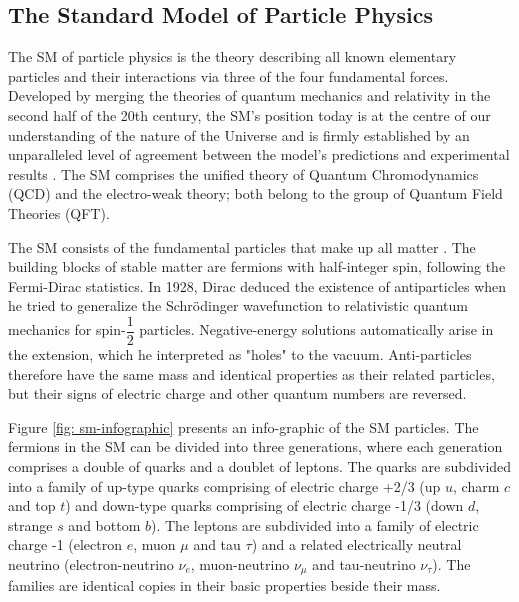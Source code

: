 \subsection{The Standard Model of Particle Physics}
The SM of particle physics \cite{SM-bkg, PhysRevLett.19.1264, GLASHOW1961579} is the theory describing all known elementary particles and their interactions via three of the four fundamental forces. Developed by merging the theories of quantum mechanics and relativity in the second half of the 20th century, the SM’s position today is at the centre of our understanding of the nature of the Universe and is firmly established by an unparalleled level of agreement between the model’s predictions and experimental results \cite{Morel2020-kf}. The SM comprises the unified theory of Quantum Chromodynamics (QCD) and the electro-weak theory; both belong to the group of Quantum Field Theories (QFT).

The SM consists of the fundamental particles that make up all matter \cite{Povh:1995mua}. The building blocks of stable matter are fermions with half-integer spin, following the Fermi-Dirac statistics. In 1928, Dirac deduced the existence of antiparticles when he tried to generalize the Schr\"{o}dinger wavefunction to relativistic quantum mechanics for spin-$\dfrac{1}{2}$ particles. Negative-energy solutions automatically arise in the extension, which he interpreted as "holes" to the vacuum. Anti-particles therefore have the same mass and identical properties as their related particles, but their signs of electric charge and other quantum numbers are reversed. 

Figure \ref{fig: sm-infographic} presents an info-graphic of the SM particles. The fermions in the SM can be divided into three generations, where each generation comprises a double of quarks and a doublet of leptons. The quarks are subdivided into a family of up-type quarks comprising of electric charge +2/3 (up $u$, charm $c$ and top $t$) and down-type quarks comprising of electric charge -1/3 (down $d$, strange $s$ and bottom $b$). The leptons are subdivided into a family of electric charge -1 (electron $e$, muon $\mu$ and tau $\tau$) and a related electrically neutral neutrino (electron-neutrino $\nu_e$, muon-neutrino $\nu_{\mu}$ and tau-neutrino $\nu_{\tau}$). The families are identical copies in their basic properties beside their mass.


